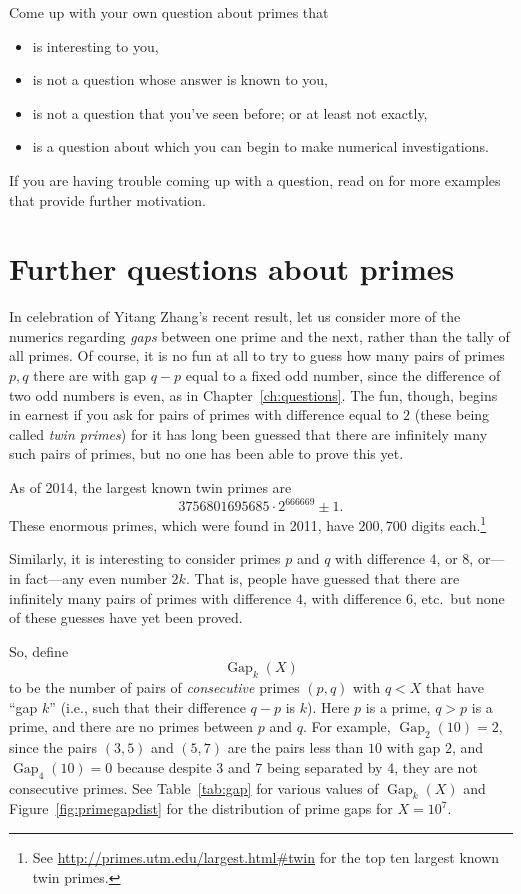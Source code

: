 \documentclass[openany]{book}
\DeclareMathOperator{\Gap}{Gap}
\theoremstyle{plain}
\theoremstyle{definition}
\begin{document}
Come up with your own question about primes that
 \begin{itemize}
 \item     is interesting to you,
  \item    is not a question whose answer is known to you,
 \item     is not a question that you've seen before; or at least not exactly,
  \item    is a question about which you can begin to make numerical investigations.
 \end{itemize}
If you are having trouble coming up with a question, read on for more
examples that  provide further motivation.

\chapter{Further questions about primes\label{ch:further}}

In celebration of Yitang Zhang's recent result, let us consider more of the numerics
regarding {\em gaps} between one prime and the next, rather than the tally
of all primes. Of course, it is no fun at all to try to guess how many
pairs of primes $p, q$ there are with gap $q-p$ equal to a fixed odd
number, since the difference of two odd numbers is even, as
in Chapter~\ref{ch:questions}.  The fun,
though, begins in earnest if you ask for pairs of primes with
difference equal to $2$ (these being called {\em twin primes}) for it
has long been guessed that there are infinitely many such pairs of
primes, but no one has been able to prove this yet.

As of 2014, the largest known twin primes are
$$3756801695685\cdot 2^{666669} \pm 1.$$
These enormous primes, which were found in 2011, have $200{,}700$ digits each.\footnote{See \url{http://primes.utm.edu/largest.html\#twin} for the top ten
largest known twin primes.}


Similarly, it is interesting to consider primes $p$ and $q$
with difference $4$, or $8$, or---in fact---any even number
$2k$. That is, people have guessed that there are infinitely many
pairs of primes with difference $4$, with difference $6$, etc.\ but
none of these guesses have yet been proved.





So, define
$$
  \Gap_{k}(X)
$$
to be the number of pairs of {\em consecutive} primes $(p,q)$ with
$q<X$ that have ``gap $k$'' (i.e., such that their difference $q-p$ is
$k$).  Here $p$ is a prime, $q>p$ is a prime, and there are no primes
between $p$ and $q$.  For example, $\Gap_2(10) = 2$, since the pairs
$(3,5)$ and $(5,7)$ are the pairs less than $10$ with gap $2$,
and $\Gap_{4}(10)=0$ because despite $3$ and $7$ being separated
by $4$, they are not consecutive primes.
See Table~\ref{tab:gap} for various values of $\Gap_{k}(X)$ and
Figure~\ref{fig:primegapdist} for the distribution of prime gaps for
$X=10^7$.
\end{document}
